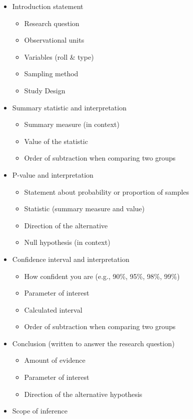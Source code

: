 \documentclass[
]{report}
\begin{document}
\begin{itemize}
\item
  Introduction statement

  \begin{itemize}
  \item
    Research question
  \item
    Observational units
  \item
    Variables (roll \& type)
  \item
    Sampling method
  \item
    Study Design
  \end{itemize}
\item
  Summary statistic and interpretation

  \begin{itemize}
  \item
    Summary measure (in context)
  \item
    Value of the statistic
  \item
    Order of subtraction when comparing two groups
  \end{itemize}
\item
  P-value and interpretation

  \begin{itemize}
  \item
    Statement about probability or proportion of samples
  \item
    Statistic (summary measure and value)
  \item
    Direction of the alternative
  \item
    Null hypothesis (in context)
  \end{itemize}
\item
  Confidence interval and interpretation

  \begin{itemize}
  \item
    How confident you are (e.g., 90\%, 95\%, 98\%, 99\%)
  \item
    Parameter of interest
  \item
    Calculated interval
  \item
    Order of subtraction when comparing two groups
  \end{itemize}
\item
  Conclusion (written to answer the research question)

  \begin{itemize}
  \item
    Amount of evidence
  \item
    Parameter of interest
  \item
    Direction of the alternative hypothesis
  \end{itemize}
\item
  Scope of inference


\end{itemize}
\end{document}

